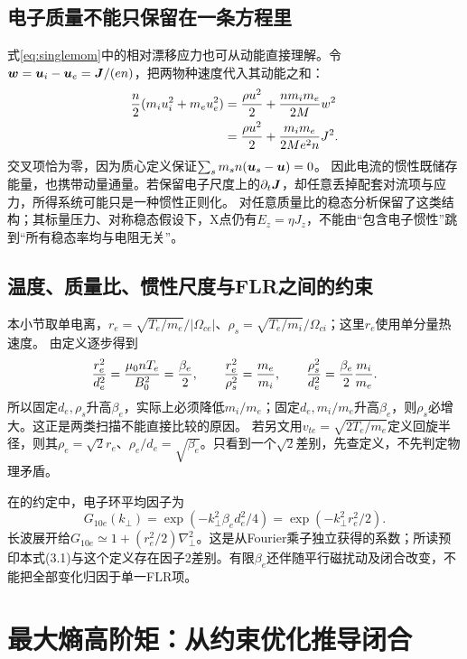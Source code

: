 \documentclass[UTF8,a4paper,11pt,openany,fontset=fandol]{ctexbook}
\begin{document}
\subsection{电子质量不能只保留在一条方程里}
式\eqref{eq:singlemom}中的相对漂移应力也可从动能直接理解。令$\bm{w}=\bm{u}_i-\bm{u}_e=\bm{J}/(en)$，把两物种速度代入其动能之和：
\begin{align}
 {n\over2}(m_iu_i^2+m_eu_e^2)
 &= {\rho u^2\over2}+{nm_im_e\over2M}w^2\\
 &= {\rho u^2\over2}+{m_im_e\over2Me^2n}J^2.
 \label{eq:selected-driftenergy}
\end{align}
交叉项恰为零，因为质心定义保证$\sum_s m_sn(\bm{u}_s-\bm{u})=0$。
因此电流的惯性既储存能量，也携带动量通量。若保留电子尺度上的$\partial_t\bm{J}$，却任意丢掉配套对流项与应力，所得系统可能只是一种惯性正则化。
\citet{L160}对任意质量比的稳态分析保留了这类结构；其标量压力、对称稳态假设下，X点仍有$E_z=\eta J_z$，不能由“包含电子惯性”跳到“所有稳态率均与电阻无关”。

\subsection{温度、质量比、惯性尺度与FLR之间的约束}
本小节取单电离，$r_e=\sqrt{T_e/m_e}/|\Omega_{ce}|$、$\rho_s=\sqrt{T_e/m_i}/\Omega_{ci}$；这里$r_e$使用单分量热速度。
由定义逐步得到
\begin{equation}
 {r_e^2\over d_e^2}={\mu_0nT_e\over B_0^2}={\beta_e\over2},\qquad
 {r_e^2\over\rho_s^2}={m_e\over m_i},\qquad
 {\rho_s^2\over d_e^2}={\beta_e\over2}{m_i\over m_e}.
 \label{eq:selected-beta}
\end{equation}
所以固定$d_e,\rho_s$升高$\beta_e$，实际上必须降低$m_i/m_e$；固定$d_e,m_i/m_e$升高$\beta_e$，则$\rho_s$必增大。这正是\citet{E474}两类扫描不能直接比较的原因。
若另文用$v_{te}=\sqrt{2T_e/m_e}$定义回旋半径，则其$\rho_e=\sqrt2r_e$、$\rho_e/d_e=\sqrt{\beta_e}$。只看到一个$\sqrt2$差别，先查定义，不先判定物理矛盾。

在\citet{E474}的约定中，电子环平均因子为
\begin{equation}
 G_{10e}(k_\perp)=\exp(-k_\perp^2\beta_ed_e^2/4)
 =\exp(-k_\perp^2r_e^2/2).
\end{equation}
长波展开给$G_{10e}\simeq1+(r_e^2/2)\nabla_\perp^2$。这是从Fourier乘子独立获得的系数；所读预印本式(3.1)与这个定义存在因子2差别。有限$\beta_e$还伴随平行磁扰动及闭合改变，不能把全部变化归因于单一FLR项。

\section{最大熵高阶矩：从约束优化推导闭合}
\end{document}
